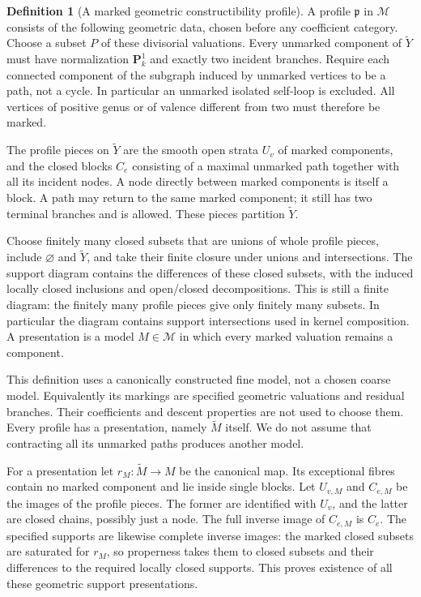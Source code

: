 \documentclass[11pt]{article}
\theoremstyle{definition}
\newtheorem{definition}[theorem]{Definition}
\theoremstyle{remark}
\begin{document}
\begin{definition}[A marked geometric constructibility profile]
\label{def:marked-profile}
A profile $\mathfrak p$ in $\mathscr M$ consists of the following
geometric data, chosen before any coefficient category.
Choose a subset $P$ of these divisorial valuations.  Every unmarked
component of $\widetilde Y$ must have normalization $\mathbf P^1_k$
and exactly two incident branches.  Require each connected component
of the subgraph induced by unmarked vertices to be a path, not a cycle.
In particular an unmarked isolated self-loop is excluded.
All vertices of positive genus or of valence different from two
must therefore be marked.

The profile pieces on $\widetilde Y$ are the smooth open strata
$U_v$ of marked components, and the closed blocks $C_e$ consisting
of a maximal unmarked path together with all its incident nodes.
A node directly between marked components is itself a block.
A path may return to the same marked component; it still has two
terminal branches and is allowed.  These pieces partition
$\widetilde Y$.

Choose finitely many closed subsets that are unions of whole profile
pieces, include $\varnothing$ and $\widetilde Y$, and take their finite
closure under unions and intersections. The support diagram contains
the differences of these closed subsets, with the induced locally
closed inclusions and open/closed decompositions. This is still a
finite diagram: the finitely many profile pieces give only finitely
many subsets. In particular the diagram contains support
intersections used in kernel composition. A presentation is a model
$M\in\mathscr M$ in which every marked valuation remains a component.
\end{definition}

This definition uses a canonically constructed fine model, not a
chosen coarse model.  Equivalently its markings are specified
geometric valuations and residual branches.  Their coefficients
and descent properties are not used to choose them.  Every profile
has a presentation, namely $\widetilde M$ itself.  We do not assume
that contracting all its unmarked paths produces another model.

For a presentation let $r_M:\widetilde M\to M$ be the canonical
map.  Its exceptional fibres contain no marked component and lie
inside single blocks.  Let $U_{v,M}$ and $C_{e,M}$ be the images of
the profile pieces.  The former are identified with $U_v$, and the
latter are closed chains, possibly just a node.  The full inverse
image of $C_{e,M}$ is $C_e$.  The specified supports are likewise
complete inverse images: the marked closed subsets are saturated
for $r_M$, so properness takes them to closed subsets and their
differences to the required locally closed supports.  This proves
existence of all these geometric support presentations.
\end{document}
